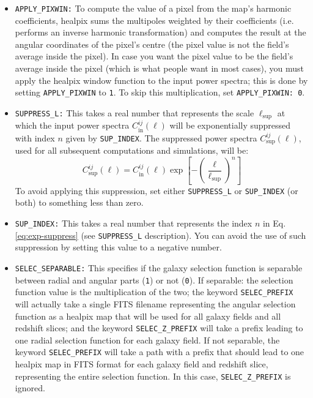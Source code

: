 \documentclass[12pt]{book} %
\newcommand{\nv}[1]{\mathrm{#1}}                 %
\begin{document}
\begin{itemize}
\item {\tt APPLY\_PIXWIN:} To compute the value of a pixel from the map's harmonic coefficients, 
  {\sc healpix} sums the multipoles weighted by their coefficients (i.e. performs an inverse 
  harmonic transformation) and computes the result at the angular coordinates of the pixel's 
  centre (the pixel value is not the field's average inside the pixel). In case you want the pixel 
  value to be the field's average inside the pixel (which is what people want in most cases), 
  you must apply the {\sc healpix} window function 
  to the input power spectra; this is done by setting {\tt APPLY\_PIXWIN} to {\tt 1}. To skip 
  this multiplication, set {\tt APPLY\_PIXWIN: 0}.

\item {\tt SUPPRESS\_L:} This takes a real number that represents the scale $\ell_{\nv{sup}}$ 
  at which the input power spectra $C_{\nv{in}}^{ij}(\ell)$ will be exponentially suppressed 
  with index $n$ given by {\tt SUP\_INDEX}. The suppressed power spectra $C_{\nv{sup}}^{ij}(\ell)$, 
  used for all subsequent computations and simulations, will be: 
  \begin{equation}
    C_{\nv{sup}}^{ij}(\ell) = C_{\nv{in}}^{ij}(\ell) \exp \left[ - \left(\frac{\ell}{\ell_{\nv{sup}}}\right)^n\right]
    \label{eq:exp-suppress}
  \end{equation}
  To avoid applying this suppression, set either {\tt SUPPRESS\_L} or {\tt SUP\_INDEX} (or both) 
  to something less than zero.

\item {\tt SUP\_INDEX:} This takes a real number that represents the index $n$ in Eq. 
  \ref{eq:exp-suppress} (see {\tt SUPPRESS\_L} description). You can avoid the use 
  of such suppression by setting this value to a negative number.

\item {\tt SELEC\_SEPARABLE:} This specifies if the galaxy selection function is separable between 
  radial and angular parts ({\tt 1}) or not ({\tt 0}). If separable: the selection function value is 
  the multiplication of the two; the keyword {\tt SELEC\_PREFIX} 
  will actually take a single FITS filename representing the angular selection function 
  as a {\sc healpix} map that will be used for all galaxy fields and all redshift slices; and the 
  keyword {\tt SELEC\_Z\_PREFIX} will take a prefix leading to one radial selection function for each 
  galaxy field. If not separable, the keyword {\tt SELEC\_PREFIX} will take a path with a prefix that 
  should lead to one {\sc healpix} map in FITS format for each galaxy field and redshift slice, 
  representing the entire selection function. In this case, {\tt SELEC\_Z\_PREFIX} is ignored.


\end{itemize}
\end{document}
